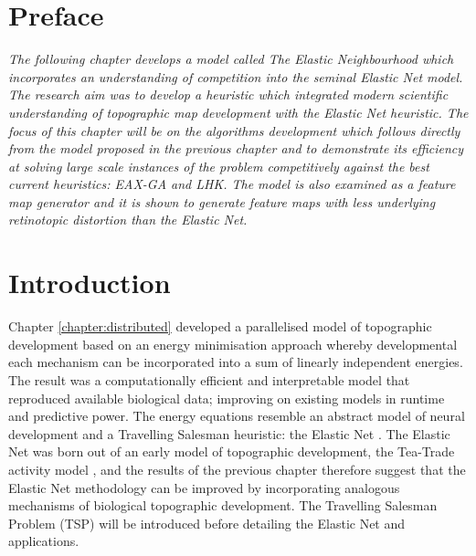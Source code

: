 \section{Preface}
\textit{The following chapter develops a model called The Elastic Neighbourhood which incorporates an understanding of competition into the seminal Elastic Net model. The research aim was to develop a heuristic which integrated modern scientific understanding of topographic map development with the Elastic Net heuristic. The focus of this chapter will be on the algorithms development which follows directly from the model proposed in the previous chapter and to demonstrate its efficiency at solving large scale instances of the problem competitively against the best current heuristics: EAX-GA and LHK. The model is also examined as a feature map generator and it is shown to generate feature maps with less underlying retinotopic distortion than the Elastic Net.}

\section{Introduction \label{section:elasticintro}}
Chapter \ref{chapter:distributed} developed a parallelised model of topographic development based on an energy minimisation approach whereby developmental each mechanism can be incorporated into a sum of linearly independent energies. The result was a computationally efficient and interpretable model that reproduced available biological data; improving on existing models in runtime and predictive power. The energy equations resemble an abstract model of neural development and a Travelling Salesman heuristic: the Elastic Net \cite{Durbin1987-ki}. The Elastic Net was born out of an early model of topographic development, the Tea-Trade activity model \cite{Willshaw1976-ew}, and the results of the previous chapter therefore suggest that the Elastic Net methodology can be improved by incorporating analogous mechanisms of biological topographic development. The Travelling Salesman Problem (TSP) will be introduced before detailing the Elastic Net and applications.
